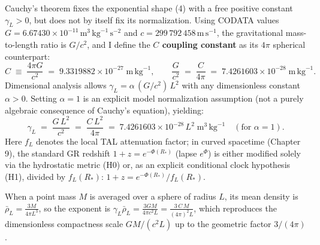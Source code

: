 \documentclass[10pt,a4paper]{article}
\begin{document}
\par
Cauchy's theorem fixes the exponential shape (4) with a free positive constant $\gamma_L > 0$, but does not by itself fix its normalization. Using CODATA values $G = 6.67430\times 10^{-11}\,\text{m}^3\,\text{kg}^{-1}\,\text{s}^{-2}$ and $c = 299\,792\,458\,\text{m}\,\text{s}^{-1}$, the gravitational mass-to-length ratio is $G/c^2$, and I define the \textbf{$C$ coupling constant} as its $4\pi$ spherical counterpart:
\begin{equation}
  C \;\equiv\; \frac{4\pi G}{c^2} \;=\; 9.3319882\times 10^{-27}\;\text{m}\,\text{kg}^{-1}, \qquad
  \frac{G}{c^2} \;=\; \frac{C}{4\pi} \;=\; 7.4261603\times 10^{-28}\;\text{m}\,\text{kg}^{-1}.
\end{equation}
Dimensional analysis allows $\gamma_L = \alpha\,(G/c^2)\,L^2$ with any dimensionless constant $\alpha > 0$. Setting $\alpha = 1$ is an explicit model normalization assumption (not a purely algebraic consequence of Cauchy's equation), yielding:
\begin{equation}
  \gamma_L \;=\; \frac{G\,L^2}{c^2} \;=\; \frac{C\,L^2}{4\pi} \;=\; 7.4261603\times 10^{-28}\,L^2\;\text{m}^3\,\text{kg}^{-1}\quad(\text{for }\alpha=1).
\end{equation}
Here $f_L$ denotes the local TAL attenuation factor; in curved spacetime (Chapter 9), the standard GR redshift $1+z = e^{-\Phi(R_*)}$ (lapse $e^{\Phi}$) is either modified solely via the hydrostatic metric (H0) or, as an explicit conditional clock hypothesis (H1), divided by $f_L(R_*)$: $1+z = e^{-\Phi(R_*)}/f_L(R_*)$.

When a point mass $M$ is averaged over a sphere of radius $L$, its mean density is $\bar{\rho}_L = \frac{3M}{4\pi L^3}$, so the exponent is $\gamma_L \bar{\rho}_L = \frac{3GM}{4\pi c^2 L} = \frac{3\,C\,M}{(4\pi)^2 L}$, which reproduces the dimensionless compactness scale $GM/(c^2 L)$ up to the geometric factor $3/(4\pi)$.
\end{document}
